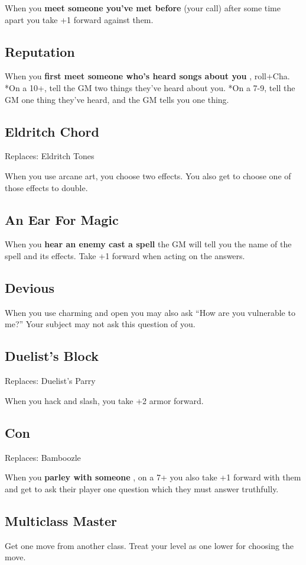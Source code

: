  When you \textbf{meet someone you've met before}
 (your call) after some time apart you take +1 forward against them.
\subsection{Reputation}


 When you \textbf{first meet someone who's heard songs about you}
, roll+Cha. *On a 10+, tell the GM two things they've heard about you. *On a 7-9, tell the GM one thing they've heard, and the GM tells you one thing.
\subsection{Eldritch Chord}


 Replaces: Eldritch Tones


 When you use arcane art, you choose two effects. You also get to choose one of those effects to double.
\subsection{An Ear For Magic}


 When you \textbf{hear an enemy cast a spell}
 the GM will tell you the name of the spell and its effects. Take +1 forward when acting on the answers.
\subsection{Devious}


 When you use charming and open you may also ask ``How are you vulnerable to me?'' Your subject may not ask this question of you.
\subsection{Duelist's Block}


 Replaces: Duelist's Parry


 When you hack and slash, you take +2 armor forward.
\subsection{Con}


 Replaces: Bamboozle


 When you \textbf{parley with someone}
, on a 7+ you also take +1 forward with them and get to ask their player one question which they must answer truthfully.
\subsection{Multiclass Master}


 Get one move from another class. Treat your level as one lower for choosing the move.


